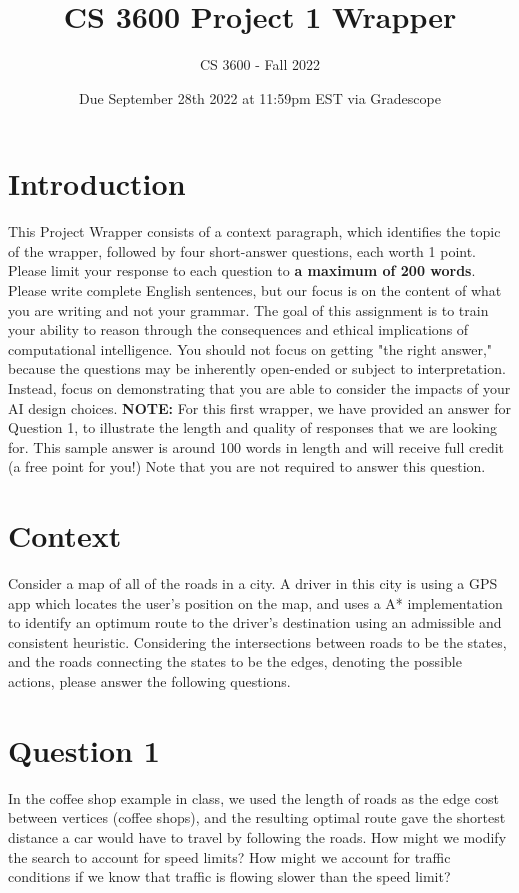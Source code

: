 \documentclass[12pt]{extarticle}
\title{CS 3600 Project 1 Wrapper}
\author{CS 3600 - Fall 2022}
\date{Due September 28th 2022 at 11:59pm EST via Gradescope}
\begin{document}
\maketitle

\section*{Introduction}

This Project Wrapper consists of a context paragraph, which identifies the topic of the wrapper, followed by four short-answer questions, each worth 1 point. Please limit your response to each question to \textbf{a maximum of 200 words}. Please write complete English sentences, but our focus is on the content of what you are writing and not your grammar. The goal of this assignment is to train your ability to reason through the consequences and ethical implications of computational intelligence. You should not focus on getting "the right answer," because the questions may be inherently open-ended or subject to interpretation.  Instead, focus on demonstrating that you are able to consider the impacts of your AI design choices.  \textbf{NOTE:} For this first wrapper, we have provided an answer for Question 1, to illustrate the length and quality of responses that we are looking for. This sample answer is around 100 words in length and will receive full credit (a free point for you!) Note that you are not required to answer this question.

\section*{Context}

Consider a map of all of the roads in a city.  A driver in this city is using a GPS app which locates the user’s position on the map, and uses a A* implementation to identify an optimum route to the driver’s destination using an admissible and consistent heuristic.  Considering the intersections between roads to be the states, and the  roads  connecting the states to be the edges, denoting the possible actions, please answer  the  following questions.

\newpage
\section*{Question 1}

In the coffee shop example in class, we used the length of roads as the edge cost between vertices (coffee shops), and the resulting optimal route gave the shortest distance a car would have to travel by following the roads. How might we modify the search to account for speed limits?  How might we account for traffic conditions if we know that traffic is flowing slower than the speed limit? \\
\end{document}
